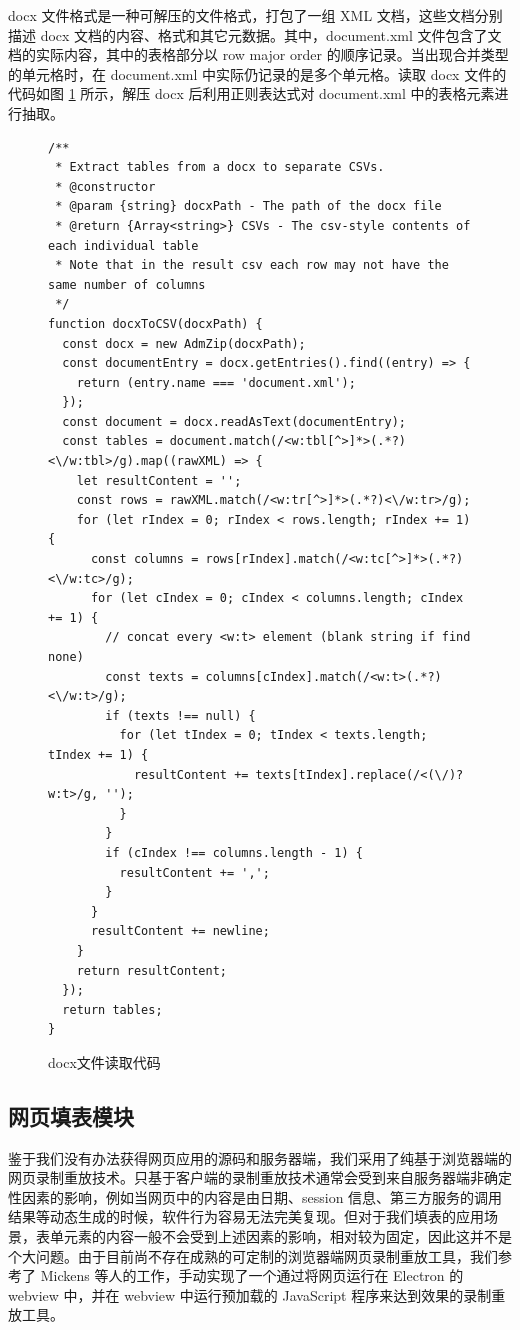 \documentclass[design, pageheader]{njubachelor}
\begin{document}
docx 文件格式是一种可解压的文件格式，打包了一组 XML 文档，这些文档分别描述 docx 文档的内容、格式和其它元数据。其中，document.xml 文件包含了文档的实际内容，其中的表格部分以 row major order 的顺序记录。当出现合并类型的单元格时，在 document.xml 中实际仍记录的是多个单元格。读取 docx 文件的代码如图 \ref{fig:docx} 所示，解压 docx 后利用正则表达式对 document.xml 中的表格元素进行抽取。\\

\begin{figure}
    \begin{lstlisting}[style=htmlcssjs]
/**
 * Extract tables from a docx to separate CSVs.
 * @constructor
 * @param {string} docxPath - The path of the docx file
 * @return {Array<string>} CSVs - The csv-style contents of each individual table
 * Note that in the result csv each row may not have the same number of columns
 */
function docxToCSV(docxPath) {
  const docx = new AdmZip(docxPath);
  const documentEntry = docx.getEntries().find((entry) => {
    return (entry.name === 'document.xml');
  });
  const document = docx.readAsText(documentEntry);
  const tables = document.match(/<w:tbl[^>]*>(.*?)<\/w:tbl>/g).map((rawXML) => {
    let resultContent = '';
    const rows = rawXML.match(/<w:tr[^>]*>(.*?)<\/w:tr>/g);
    for (let rIndex = 0; rIndex < rows.length; rIndex += 1) {
      const columns = rows[rIndex].match(/<w:tc[^>]*>(.*?)<\/w:tc>/g);
      for (let cIndex = 0; cIndex < columns.length; cIndex += 1) {
        // concat every <w:t> element (blank string if find none)
        const texts = columns[cIndex].match(/<w:t>(.*?)<\/w:t>/g);
        if (texts !== null) {
          for (let tIndex = 0; tIndex < texts.length; tIndex += 1) {
            resultContent += texts[tIndex].replace(/<(\/)?w:t>/g, '');
          }
        }
        if (cIndex !== columns.length - 1) {
          resultContent += ',';
        }
      }
      resultContent += newline;
    }
    return resultContent;
  });
  return tables;
}
    \end{lstlisting}
    \caption{docx文件读取代码}
    \label{fig:docx}
\end{figure}

\subsection{网页填表模块}
鉴于我们没有办法获得网页应用的源码和服务器端，我们采用了纯基于浏览器端的网页录制重放技术。只基于客户端的录制重放技术通常会受到来自服务器端非确定性因素的影响，例如当网页中的内容是由日期、session 信息、第三方服务的调用结果等动态生成的时候，软件行为容易无法完美复现。但对于我们填表的应用场景，表单元素的内容一般不会受到上述因素的影响，相对较为固定，因此这并不是个大问题。由于目前尚不存在成熟的可定制的浏览器端网页录制重放工具，我们参考了 Mickens 等人的工作\cite{mickens10}，手动实现了一个通过将网页运行在 Electron 的 webview 中，并在 webview 中运行预加载的 JavaScript 程序来达到效果的录制重放工具。
\end{document}
